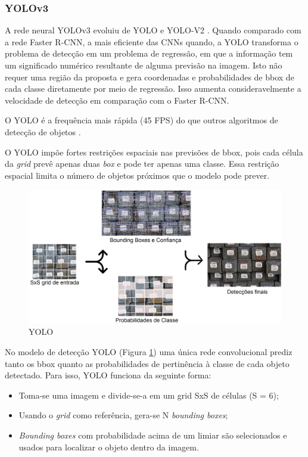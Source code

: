 \subsubsection*{YOLOv3}\label{sub:Yolov3}

A rede neural YOLOv3 evoluiu de YOLO e YOLO-V2 \cite{redmon2018yolov3}. Quando comparado com a rede Faster R-CNN, a mais eficiente das CNNs quando, a YOLO transforma o problema de detecção em um problema de regressão, em que a informação tem um significado numérico resultante de alguma previsão na imagem. Isto não requer uma região da proposta e gera coordenadas e probabilidades de bbox de cada classe diretamente por meio de regressão. Isso aumenta consideravelmente a velocidade de detecção em comparação com o Faster R-CNN.\cite{yolov3_apple}

O YOLO é a frequência mais rápida (45 FPS) do que outros algoritmos de detecção de objetos \cite{yolov3RealTime}.

O YOLO impõe fortes restrições espaciais nas previsões de bbox, pois cada célula da \textit{grid} prevê apenas duas \textit{box} e pode ter apenas uma classe. Essa restrição espacial limita o número de objetos próximos que o modelo pode prever. \cite{yolov3RealTime}

\begin{figure}[htbp]
		\centering
		\includegraphics[scale=0.2]{figuras/MachineLearning/yolo.png}
		\caption{YOLO}
		\label{fig:yolo}
\end{figure}

No modelo de detecção YOLO (Figura \ref{fig:yolo}) uma única rede convolucional prediz tanto os bbox quanto as probabilidades de pertinência à classe de cada objeto detectado. Para isso, YOLO funciona da seguinte forma:

\begin{itemize}
    \item Toma-se uma imagem e divide-se-a em um grid SxS de células (S = 6);
    \item Usando o \textit{grid} como referência, gera-se N \textit{bounding boxes};
    \item \textit{Bounding boxes} com probabilidade acima de um limiar são selecionados e usados para localizar o objeto dentro da imagem.
\end{itemize}

